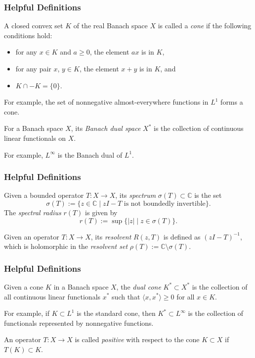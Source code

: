 \documentclass{beamer}
\newcommand{\C}{\mathbb{C}}
\begin{document}
\begin{frame}
	\frametitle{Helpful Definitions}
	\begin{definition}
		A closed convex set $K$ of the real Banach space $X$ is called a \emph{cone} if the following conditions hold:
		\begin{itemize}
			\item for any $x \in K$ and $a \geq 0$, the element $ax$ is in $K$,
			\pause
			\item for any pair $x$, $y \in K$, the element $x + y$ is in $K$, and
			\pause
			\item $K \cap -K = \{0\}$.
		\end{itemize}
	\end{definition}
	\pause
	For example, the set of nonnegative almost-everywhere functions in $L^1$ forms a cone.
	\pause
	\begin{definition}
		For a Banach space $X$, its \emph{Banach dual space} $X^*$ is the collection of continuous linear functionals on $X$.
	\end{definition}
	\pause
	For example, $L^\infty$ is the Banach dual of $L^1$.
\end{frame}

\begin{frame}
	\frametitle{Helpful Definitions}
	\begin{definition}
		Given a bounded operator $T:X \to X$, its \emph{spectrum} $\sigma(T) \subset \C$ is the set
		\[\sigma(T):=\{z \in \C \mid zI - T \text{ is not boundedly invertible}\}.\]
		\pause
		The \emph{spectral radius} $r(T)$ is given by
		\[r(T):= \sup \{ |z| \mid z \in \sigma(T)\}.\]
	\end{definition}
		\pause
	\begin{definition}
		Given an operator $T:X \to X$, its \emph{resolvent} $R(z, T)$ is defined as $(zI - T)^{-1}$, which is holomorphic in the \emph{resolvent set} $\rho(T) := \C \setminus \sigma(T)$.
	\end{definition}
\end{frame}

\begin{frame}
	\frametitle{Helpful Definitions}
	\begin{definition}
		Given a cone $K$ in a Banach space $X$, the \emph{dual cone} $K^* \subset X^*$ is the collection of all continuous linear functionals $x^*$ such that $\langle x, x^* \rangle \geq 0$ for all $x \in K$.
	\end{definition}
	\pause
	For example, if $K \subset L^1$ is the standard cone, then $K^* \subset L^\infty$ is the collection of functionals represented by nonnegative functions.
	\pause
	\begin{definition}
		An operator $T:X \to X$ is called \emph{positive} with respect to the cone $K \subset X$ if $T(K) \subset K$.
	\end{definition}
\end{frame}
\end{document}
